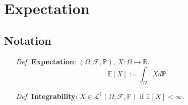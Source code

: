 \documentclass[a4paper,12pt,twoside]{book}
\begin{document}
\section{Expectation}

\subsection{Notation}
\begin{itemize}
	\item[\textit{Def.}] \textbf{Expectation}: $(\Omega, \mathcal{F}, \mathbb{P})$, $X: \Omega \mapsto \bar{\mathbb{R}}$.
	\begin{equation}
		\mathbb{E}[X]:=\int_{\Omega} X d \mathbb{P}
	\end{equation}

	\item[\textit{Def.}] \textbf{Integrability}: $X\in \mathcal{L}^1(\Omega, \mathcal{F}, \mathbb{P})$ if $\mathbb{E}[X]< \infty$.
\end{itemize}

\end{document}
